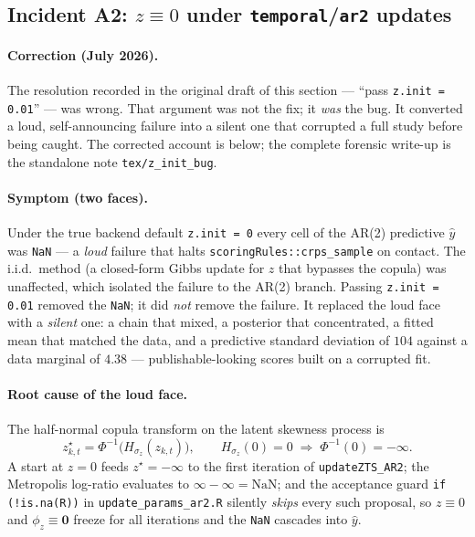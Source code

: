 \documentclass[11pt]{article}
\theoremstyle{definition}
\theoremstyle{remark}
\begin{document}
\subsection{Incident A2: $z \equiv 0$ under \texttt{temporal}/\texttt{ar2} updates}
\label{sec:audit-zinit}

\paragraph{Correction (July 2026).}
The resolution recorded in the original draft of this section --- ``pass
\texttt{z.init = 0.01}'' --- was wrong. That argument was not the fix; it
\emph{was} the bug. It converted a loud, self-announcing failure into a
silent one that corrupted a full study before being caught. The corrected
account is below; the complete forensic write-up is the standalone note
\texttt{tex/z\_init\_bug}.

\paragraph{Symptom (two faces).}
Under the true backend default \texttt{z.init = 0} every cell of the AR(2)
predictive $\hat y$ was \texttt{NaN} --- a \emph{loud} failure that halts
\texttt{scoringRules::crps\_sample} on contact. The i.i.d.\ method (a
closed-form Gibbs update for $z$ that bypasses the copula) was unaffected,
which isolated the failure to the AR(2) branch. Passing
\texttt{z.init = 0.01} removed the \texttt{NaN}; it did \emph{not} remove
the failure. It replaced the loud face with a \emph{silent} one: a chain
that mixed, a posterior that concentrated, a fitted mean that matched the
data, and a predictive standard deviation of $104$ against a data marginal
of $4.38$ --- publishable-looking scores built on a corrupted fit.

\paragraph{Root cause of the loud face.}
The half-normal copula transform on the latent skewness process is
\begin{equation*}
  z^\star_{k,t} = \Phi^{-1}\!\big(H_{\sigma_z}(z_{k,t})\big),
  \qquad
  H_{\sigma_z}(0) = 0
  \;\Longrightarrow\;
  \Phi^{-1}(0) = -\infty .
\end{equation*}
A start at $z = 0$ feeds $z^\star = -\infty$ to the first iteration of
\texttt{updateZTS\_AR2}; the Metropolis log-ratio evaluates to
$\infty - \infty = \mathrm{NaN}$; and the acceptance guard
\texttt{if (!is.na(R))} in \texttt{update\_params\_ar2.R} silently
\emph{skips} every such proposal, so $z \equiv 0$ and $\phi_z \equiv \bm 0$
freeze for all iterations and the \texttt{NaN} cascades into $\hat y$.
\end{document}
